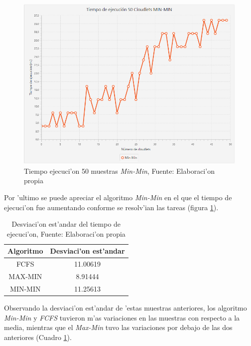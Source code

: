\newpage
\setcounter{figure}{18}
\renewcommand\thefigure{\arabic{figure}}
\begin{figure}[h!] 
	\centering
	\includegraphics[scale=0.5]{media/min-min}
	\caption{Tiempo ejecuci'on 50 muestras \textit{Min-Min}, Fuente: Elaboraci'on propia}
	\label{fig:minmin}
\end{figure}


Por 'ultimo se puede apreciar el algoritmo \textit{Min-Min} en el que el tiempo de ejecuci'on fue aumentando conforme se resolv'ian las tareas (figura \ref{fig:minmin}).


\setcounter{table}{4}
\renewcommand\thetable{\arabic{table}}
\begin{table}[h!]
	\centering
	\begin{tabular}{@{}cc@{}}
		\toprule
		{\bf Algoritmo} & \multicolumn{1}{l}{{\bf Desviaci'on est'andar}} \\ \midrule
		FCFS & 11.00619 \\
		MAX-MIN & 8.91444 \\
		MIN-MIN & 11.25613 \\ \bottomrule
	\end{tabular}
	\caption{Desviaci'on est'andar del tiempo de ejecuci'on, Fuente: Elaboraci'on propia}
	\label{tiempotabla}
\end{table}

Observando la desviaci'on est'andar de 'estas muestras anteriores, los algoritmo \textit{Min-Min} y \textit{FCFS} tuvieron m'as variaciones en las muestras con respecto a la media, mientras que el \textit{Max-Min} tuvo las variaciones por debajo de las dos anteriores (Cuadro \ref{tiempotabla}).